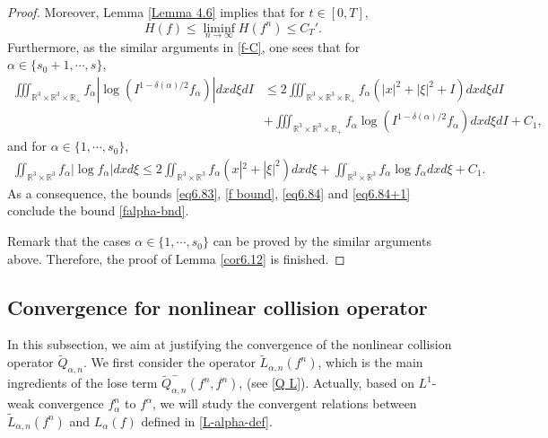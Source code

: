 \documentclass[reqno,11pt]{amsart}
\numberwithin{equation}{section}
\def\R{\mathbb{R}}
\begin{document}
\begin{proof}
Moreover,  Lemma \ref{Lemma 4.6} implies that for $t \in [0, T]$,
{\small
	\begin{equation}\label{f bound}
		H (f) \leq \liminf \limits_{n\rightarrow \infty } H (f^n) \leq C_T'.
	\end{equation}}
	Furthermore, as the similar arguments in \eqref{f-C}, one sees that for $\alpha \in \{ s_0 + 1, \cdots, s \}$,
	\begin{equation}\label{eq6.84}
		\begin{aligned}
			\iiint_{ \R^3 \times \R^3 \times \R_+} f_\alpha |\log (I^{1-\delta(\alpha)/2}f_\alpha )| dxd\xi dI 
			& \leq 2\iiint_{ \R^3 \times \R^3 \times \R_+} f_\alpha (|x|^2+|\xi|^2+I )dxd\xi dI \\
			& + \iiint_{ \R^3 \times \R^3 \times \R_+} f_\alpha \log (I^{1-\delta(\alpha)/2}f_\alpha ) dxd\xi dI +C_1 ,
		\end{aligned}
	\end{equation}
and for $\alpha \in \{ 1, \cdots, s_0 \}$,
\begin{equation}\label{eq6.84+1}
		\begin{aligned}
			\iint_{ \R^3 \times \R^3 } f_\alpha |\log f_\alpha | dxd\xi  \leq 2\iint_{ \R^3 \times \R^3 } f_\alpha (x|^2+|\xi|^2 )dxd\xi + \iint_{ \R^3 \times \R^3 } f_\alpha \log f_\alpha dxd\xi  + C_1 .
		\end{aligned}
	\end{equation}
As a consequence, the bounds \eqref{eq6.83}, \eqref{f bound}, \eqref{eq6.84} and \eqref{eq6.84+1} conclude the bound \eqref{falpha-bnd}. 

Remark that the cases $\alpha \in \{1,\cdots,s_0\}$ can be proved by the similar arguments above. Therefore, the proof of Lemma \ref{cor6.12} is finished.
\end{proof}


\subsection{Convergence for nonlinear collision operator}\label{Subsec:CFNCO}

In this subsection, we aim at justifying the convergence of the nonlinear collision operator $\tilde{Q}_{\alpha, n}$. We first consider the operator $\tilde{L}_{\alpha, n} (f^n)$, which is the main ingredients of the lose term $\tilde{Q}_{\alpha, n}^- (f^n, f^n)$, (see \eqref{Q L}). Actually, based on $L^1$-weak convergence $f^n_\alpha$ to $f^\alpha$, we will study the convergent relations between $\tilde{L}_{\alpha, n} (f^n)$ and $L_\alpha (f)$ defined in \eqref{L-alpha-def}.
\end{document}

